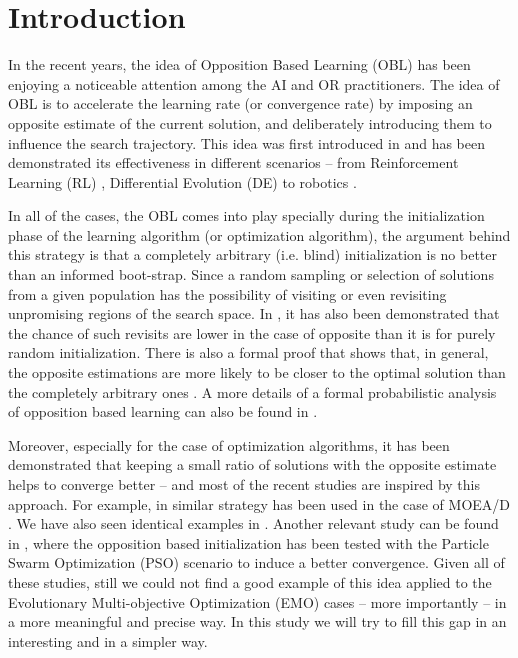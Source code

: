 \documentclass{sig-alternate-05-2015}
\begin{document}
%
%

%
%
\printccsdesc



\section{Introduction}
In the recent years, the idea of Opposition Based Learning (OBL) has been enjoying a noticeable attention among the AI and OR practitioners. The idea of OBL is to accelerate the learning rate (or convergence rate) by imposing an opposite estimate of the current solution, and deliberately introducing them to influence the search trajectory. This idea was first introduced in \cite{obl-main} and has been demonstrated its effectiveness in different scenarios -- from Reinforcement Learning (RL) \cite{obl-rl}, Differential Evolution (DE) \cite{ode-main} to robotics \cite{ode-robot}. 

In all of the cases, the OBL comes into play specially during the initialization phase of the learning algorithm (or optimization algorithm), the argument behind this strategy is that a completely arbitrary (i.e. blind) initialization is no better than an informed boot-strap. Since a random sampling or selection of solutions from a given population has the possibility of visiting or even revisiting unpromising regions of the search space. In \cite{ode-main}, it has also been demonstrated that the chance of such revisits are lower in the case of opposite than it is for purely random initialization. There is also a formal proof that shows that, in general, the opposite estimations are more likely to be closer to the optimal solution than the completely arbitrary ones \cite{theory-1}. A more details of a formal probabilistic analysis of opposition based learning can also be found in \cite{theory-2}.

Moreover, especially for the case of optimization algorithms, it has been demonstrated that keeping a small ratio of solutions with the opposite estimate helps to converge better \cite{opbil} -- and most of the recent studies are inspired by this approach. For example, in \cite{omoead} similar strategy has been used in the case of MOEA/D \cite{moead-main}. We have also seen identical examples in \cite{omode}. Another relevant study can be found in \cite{opso}, where the opposition based initialization has been tested with the Particle Swarm Optimization (PSO) scenario to induce a better convergence. Given all of these studies, still we could not find a good example of this idea applied to the Evolutionary Multi-objective Optimization (EMO) cases -- more importantly -- in a more meaningful and precise way. In this study we will try to fill this gap in an interesting and in a simpler way. 
\end{document}

